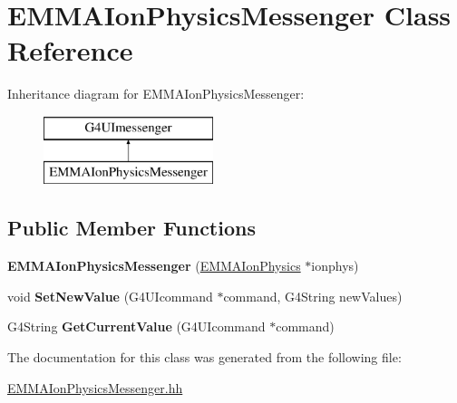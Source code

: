 \hypertarget{classEMMAIonPhysicsMessenger}{\section{E\-M\-M\-A\-Ion\-Physics\-Messenger Class Reference}
\label{classEMMAIonPhysicsMessenger}
}
Inheritance diagram for E\-M\-M\-A\-Ion\-Physics\-Messenger\-:\begin{figure}[H]
\begin{center}
\leavevmode
\includegraphics[height=2.000000cm]{classEMMAIonPhysicsMessenger}
\end{center}
\end{figure}
\subsection*{Public Member Functions}
\begin{DoxyCompactItemize}
\item 
\hypertarget{classEMMAIonPhysicsMessenger_a27e994611ceeb67f3eb701e725953e1a}{{\bfseries E\-M\-M\-A\-Ion\-Physics\-Messenger} (\hyperlink{classEMMAIonPhysics}{E\-M\-M\-A\-Ion\-Physics} $\ast$ionphys)}\label{classEMMAIonPhysicsMessenger_a27e994611ceeb67f3eb701e725953e1a}

\item 
\hypertarget{classEMMAIonPhysicsMessenger_acbaff684721ed24440911ff922f7fbb9}{void {\bfseries Set\-New\-Value} (G4\-U\-Icommand $\ast$command, G4\-String new\-Values)}\label{classEMMAIonPhysicsMessenger_acbaff684721ed24440911ff922f7fbb9}

\item 
\hypertarget{classEMMAIonPhysicsMessenger_a0864aecc7feaa9f26079ff6156ea88cb}{G4\-String {\bfseries Get\-Current\-Value} (G4\-U\-Icommand $\ast$command)}\label{classEMMAIonPhysicsMessenger_a0864aecc7feaa9f26079ff6156ea88cb}

\end{DoxyCompactItemize}


The documentation for this class was generated from the following file\-:\begin{DoxyCompactItemize}
\item 
\hyperlink{EMMAIonPhysicsMessenger_8hh}{E\-M\-M\-A\-Ion\-Physics\-Messenger.\-hh}\end{DoxyCompactItemize}
